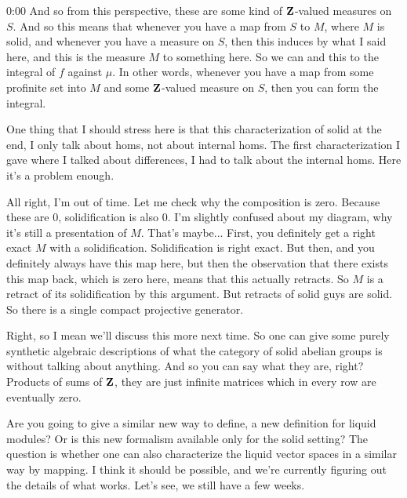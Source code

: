 \begin{unfinished}{0:00}
And so from this perspective, these are some kind of $\mathbf Z$-valued measures on $S$. And so this means that whenever you have a map from $S$ to $M$, where $M$ is solid, and whenever you have a measure on $S$, then this induces by what I said here, and this is the measure $M$ to something here. So we can and this to the integral of $f$ against $\mu$. In other words, whenever you have a map from some profinite set into $M$ and some $\mathbf Z$-valued measure on $S$, then you can form the integral.

One thing that I should stress here is that this characterization of solid at the end, I only talk about homs, not about internal homs. The first characterization I gave where I talked about differences, I had to talk about the internal homs. Here it's a problem enough.

All right, I'm out of time. Let me check why the composition is zero. Because these are $0$, solidification is also $0$. I'm slightly confused about my diagram, why it's still a presentation of $M$. That's maybe... First, you definitely get a right exact $M$ with a solidification. Solidification is right exact. But then, and you definitely always have this map here, but then the observation that there exists this map back, which is zero here, means that this actually retracts. So $M$ is a retract of its solidification by this argument. But retracts of solid guys are solid. So there is a single compact projective generator.

Right, so I mean we'll discuss this more next time. So one can give some purely synthetic algebraic descriptions of what the category of solid abelian groups is without talking about anything. And so you can say what they are, right? Products of sums of $\mathbf Z$, they are just infinite matrices which in every row are eventually zero.

Are you going to give a similar new way to define, a new definition for liquid modules? Or is this new formalism available only for the solid setting? The question is whether one can also characterize the liquid vector spaces in a similar way by mapping. I think it should be possible, and we're currently figuring out the details of what works. Let's see, we still have a few weeks.

\end{unfinished}